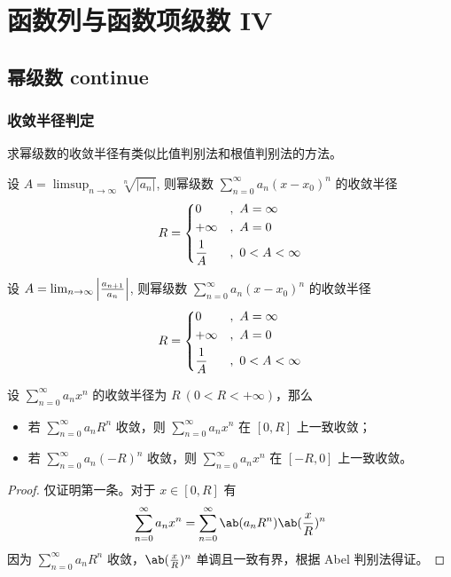 \section{函数列与函数项级数 IV}

\subsection{幂级数 continue}

\subsubsection{收敛半径判定}

求幂级数的收敛半径有类似比值判别法和根值判别法的方法。

\begin{theorem}
    设 $A = \limsup_{n \to \infty} \sqrt[n]{|a_n|}$, 则幂级数 $\sum_{n=0}^\infty a_n (x-x_0)^n$ 的收敛半径
    $$
    R = \begin{dcases}
        0 & ,\ A = \infty \\
        +\infty & ,\ A = 0 \\
        \frac{1}{A} & ,\ 0 < A < \infty
    \end{dcases}
    $$
\end{theorem}

\begin{theorem}[比值判别法]
    设 $A = \lim_{n \to \infty} \abs{\frac{a_{n+1}}{a_n}}$, 则幂级数 $\sum_{n=0}^\infty a_n (x-x_0)^n$ 的收敛半径
    $$
    R = \begin{dcases}
        0 & ,\ A = \infty \\
        +\infty & ,\ A = 0 \\
        \frac{1}{A} & ,\ 0 < A < \infty
    \end{dcases}
    $$
\end{theorem}

\begin{theorem}
    设 $\sum\limits_{n = 0}^{\infty} a_n x^{n}$ 的收敛半径为 $R\ (0 < R < +\infty)$，那么
    \begin{itemize}
        \item 若 $\sum\limits_{n = 0}^{\infty} a_n R^{n}$ 收敛，则 $\sum\limits_{n = 0}^{\infty} a_n x^{n}$ 在 $[0, R]$ 上一致收敛；
        \item 若 $\sum\limits_{n = 0}^{\infty} a_n (-R)^{n}$ 收敛，则 $\sum\limits_{n = 0}^{\infty} a_n x^{n}$ 在 $[-R, 0]$ 上一致收敛。
    \end{itemize}

    \begin{proof}
        仅证明第一条。对于 $x \in [0, R]$ 有
        $$
        \sum_{n = 0}^{\infty} a_n x^{n} = \sum_{n = 0}^{\infty} \ab(a_n R^{n}) \ab(\frac{x}{R})^{n}
        $$
        因为 $\sum\limits_{n = 0}^{\infty} a_n R^{n}$ 收敛，$\ab(\frac{x}{R})^{n}$ 单调且一致有界，根据 Abel 判别法得证。
    \end{proof}
\end{theorem}

